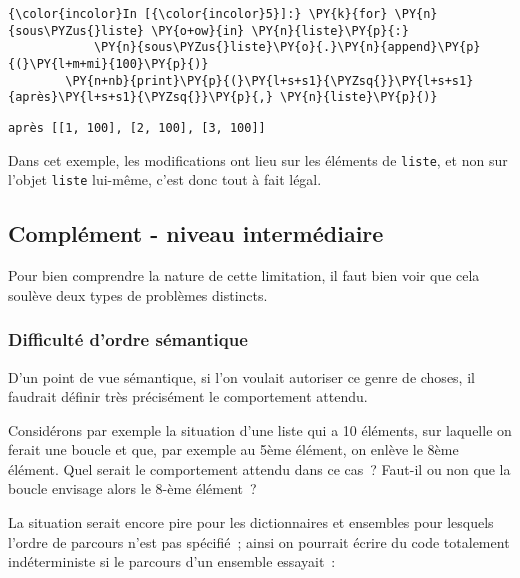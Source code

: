     \begin{Verbatim}[commandchars=\\\{\}]
{\color{incolor}In [{\color{incolor}5}]:} \PY{k}{for} \PY{n}{sous\PYZus{}liste} \PY{o+ow}{in} \PY{n}{liste}\PY{p}{:}
            \PY{n}{sous\PYZus{}liste}\PY{o}{.}\PY{n}{append}\PY{p}{(}\PY{l+m+mi}{100}\PY{p}{)}
        \PY{n+nb}{print}\PY{p}{(}\PY{l+s+s1}{\PYZsq{}}\PY{l+s+s1}{après}\PY{l+s+s1}{\PYZsq{}}\PY{p}{,} \PY{n}{liste}\PY{p}{)}
\end{Verbatim}


    \begin{Verbatim}[commandchars=\\\{\}]
après [[1, 100], [2, 100], [3, 100]]

    \end{Verbatim}

    Dans cet exemple, les modifications ont lieu sur les éléments de
\texttt{liste}, et non sur l'objet \texttt{liste} lui-même, c'est donc
tout à fait légal.

    \hypertarget{compluxe9ment---niveau-intermuxe9diaire}{%
\subsection{Complément - niveau
intermédiaire}\label{compluxe9ment---niveau-intermuxe9diaire}}

    Pour bien comprendre la nature de cette limitation, il faut bien voir
que cela soulève deux types de problèmes distincts.

    \hypertarget{difficultuxe9-dordre-suxe9mantique}{%
\subsubsection{Difficulté d'ordre
sémantique}\label{difficultuxe9-dordre-suxe9mantique}}

    D'un point de vue sémantique, si l'on voulait autoriser ce genre de
choses, il faudrait définir très précisément le comportement attendu.

Considérons par exemple la situation d'une liste qui a 10 éléments, sur
laquelle on ferait une boucle et que, par exemple au 5ème élément, on
enlève le 8ème élément. Quel serait le comportement attendu dans ce
cas~? Faut-il ou non que la boucle envisage alors le 8-ème élément~?

La situation serait encore pire pour les dictionnaires et ensembles pour
lesquels l'ordre de parcours n'est pas spécifié~; ainsi on pourrait
écrire du code totalement indéterministe si le parcours d'un ensemble
essayait~:

